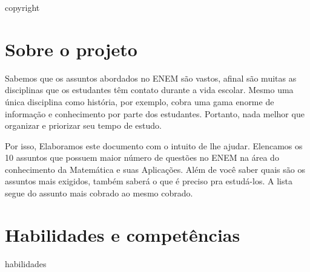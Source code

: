 \documentclass[11pt,fleqn]{book}
\begin{document}
\begingroup
\thispagestyle{empty} %
\endgroup

{copyright} %


\pagestyle{empty} %
\tableofcontents %
\cleardoublepage %
\pagestyle{fancy} %

\chapter*{Sobre o projeto}
Sabemos que os assuntos abordados no ENEM são vastos, afinal são muitas as disciplinas que os estudantes têm contato durante a vida escolar. Mesmo uma única disciplina como história, por exemplo, cobra uma gama enorme de informação e conhecimento por parte dos estudantes. Portanto, nada melhor que organizar e priorizar seu tempo de estudo.

Por isso, Elaboramos este documento com o intuito de lhe ajudar. Elencamos os 10 assuntos que possuem maior número de questões no ENEM na área do conhecimento da Matemática e suas Aplicações. Além de você saber quais são os assuntos mais exigidos, também saberá o que é preciso pra estudá-los. A lista segue do assunto mais cobrado ao mesmo cobrado.

\chapter*{Habilidades e competências}
{habilidades}
\end{document}
